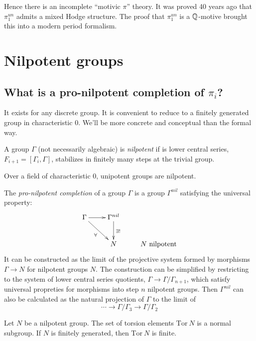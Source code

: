 Hence there is an incomplete ``motivic $\pi$'' theory. It was proved 40 years ago that $\pi_1^{un}$ admits a mixed Hodge structure. The proof that $\pi_1^{un}$ is a $\mathbb{Q}$-motive brought this into a modern period formalism.

\section{Nilpotent groups}
\subsection{What is a pro-nilpotent completion of $\pi_i$?}
It exists for any discrete group. It is convenient to reduce to a finitely generated group in characteristic 0. We'll be more concrete and conceptual than the formal way.

\begin{defn}
A group $\Gamma$ (not necessarily algebraic) is \emph{nilpotent} if is lower central series, $F_{i+1} = [\Gamma_i, \Gamma]$, stabilizes in finitely many steps at the trivial group.
\end{defn}

\begin{rem}
Over a field of characteristic 0, unipotent groups are nilpotent.
\end{rem}

\begin{defn}
The \emph{pro-nilpotent completion} of a group $\Gamma$ is a group $\Gamma^{nil}$ satisfying the universal property:
\[
\xymatrix{
\Gamma \ar[r] \ar[dr]_{\forall} & \Gamma^{nil} \ar[d]^{\exists !} & \\
& N & \textrm{$N$ nilpotent}
}
\]
It can be constructed as the limit of the projective system formed by morphisms $\Gamma \to N$ for nilpotent groups $N$. The construction can be simplified by restricting to the system of lower central series quotients, $\Gamma \to \Gamma / \Gamma_{n+1}$, which satisfy universal propreties for morphisms into step $n$ nilpotent groups. Then $\Gamma^{nil}$ can also be calculated as the natural projection of $\Gamma$ to the limit of
\[
\cdots \to \Gamma / \Gamma_3 \to \Gamma / \Gamma_2
\]
\end{defn}

\begin{lemma}
Let $N$ be a nilpotent group. The set of torsion elements $\mathrm{Tor~} N$ is a normal subgroup. If $N$ is finitely generated, then $\mathrm{Tor~} N$ is finite.
\end{lemma}

